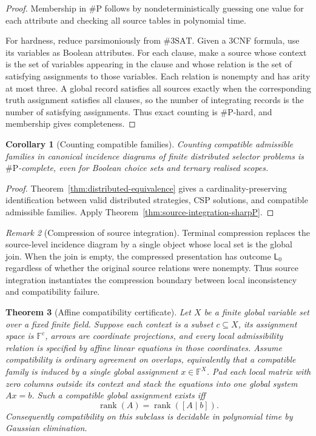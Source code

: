 \documentclass[11pt]{article}
\theoremstyle{plain}
\newtheorem{theorem}{Theorem}[section]
\newtheorem{corollary}[theorem]{Corollary}
\theoremstyle{definition}
\theoremstyle{remark}
\newtheorem{remark}[theorem]{Remark}
\begin{document}
\begin{proof}
Membership in $\#\mathrm P$ follows by nondeterministically guessing one value
for each attribute and checking all source tables in polynomial time.

For hardness, reduce parsimoniously from $\#3\mathrm{SAT}$. Given a 3CNF formula,
use its variables as Boolean attributes. For each clause, make a source whose
context is the set of variables appearing in the clause and whose relation is
the set of satisfying assignments to those variables. Each relation is nonempty
and has arity at most three. A global record satisfies all sources exactly when
the corresponding truth assignment satisfies all clauses, so the number of
integrating records is the number of satisfying assignments. Thus exact counting
is $\#\mathrm P$-hard, and membership gives completeness.
\end{proof}

\begin{corollary}[Counting compatible families]
\label{cor:counting-compatible-families}
Counting compatible admissible families in canonical incidence diagrams of
finite distributed selector problems is $\#\mathrm P$-complete, even for Boolean
choice sets and ternary realised scopes.
\end{corollary}

\begin{proof}
Theorem~\ref{thm:distributed-equivalence} gives a cardinality-preserving
identification between valid distributed strategies, CSP solutions, and
compatible admissible families. Apply
Theorem~\ref{thm:source-integration-sharpP}.
\end{proof}

\begin{remark}[Compression of source integration]
Terminal compression replaces the source-level incidence diagram by a single
object whose local set is the global join. When the join is empty, the compressed
presentation has outcome $\mathsf L_0$ regardless of whether the original source
relations were nonempty. Thus source integration instantiates the compression
boundary between local inconsistency and compatibility failure.
\end{remark}

\begin{theorem}[Affine compatibility certificate]\label{thm:affine-certificate}
Let $X$ be a finite global variable set over a fixed finite field. Suppose each
context is a subset $c\subseteq X$, its assignment space is $\mathbb F^c$,
arrows are coordinate projections, and every local admissibility relation is
specified by affine linear equations in those coordinates. Assume compatibility is ordinary agreement on overlaps, equivalently that a
compatible family is induced by a single global assignment $x\in\mathbb F^X$.
Pad each local matrix with zero columns outside its context and stack the
equations into one global system $Ax=b$. Such a compatible global assignment
exists iff
\[
\operatorname{rank}(A)=\operatorname{rank}([A\mid b]).
\]
Consequently compatibility on this subclass is decidable in polynomial time by
Gaussian elimination.
\end{theorem}
\end{document}
